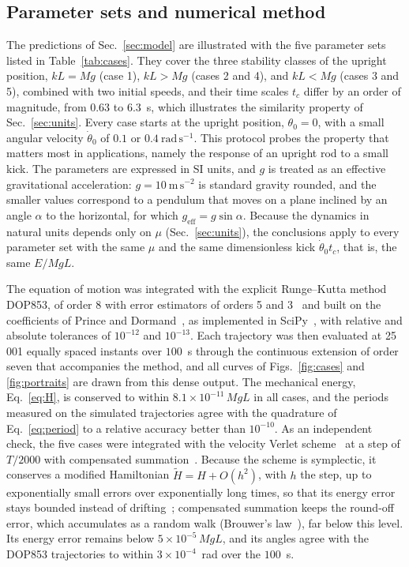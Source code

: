\subsection{Parameter sets and numerical method}\label{sec:cases_method}

The predictions of Sec.~\ref{sec:model} are illustrated with the five parameter sets listed in Table~\ref{tab:cases}. They cover the three stability classes of the upright position, $kL=Mg$ (case 1), $kL>Mg$ (cases 2 and 4), and $kL<Mg$ (cases 3 and 5), combined with two initial speeds, and their time scales $t_c$ differ by an order of magnitude, from $0.63$ to $6.3$~s, which illustrates the similarity property of Sec.~\ref{sec:units}. Every case starts at the upright position, $\theta_0=0$, with a small angular velocity $\dot\theta_0$ of $0.1$ or $0.4\ \mathrm{rad\,s^{-1}}$. This protocol probes the property that matters most in applications, namely the response of an upright rod to a small kick. The parameters are expressed in SI units, and $g$ is treated as an effective gravitational acceleration: $g=10\ \mathrm{m\,s^{-2}}$ is standard gravity rounded, and the smaller values correspond to a pendulum that moves on a plane inclined by an angle $\alpha$ to the horizontal, for which $g_{\mathrm{eff}}=g\sin\alpha$. Because the dynamics in natural units depends only on $\mu$ (Sec.~\ref{sec:units}), the conclusions apply to every parameter set with the same $\mu$ and the same dimensionless kick $\dot\theta_0t_c$, that is, the same $E/MgL$.

The equation of motion was integrated with the explicit Runge--Kutta method DOP853, of order 8 with error estimators of orders 5 and 3~\cite{HairerNW1993} and built on the coefficients of Prince and Dormand~\cite{PrinceDormand1981}, as implemented in SciPy~\cite{Virtanen2020}, with relative and absolute tolerances of $10^{-12}$ and $10^{-13}$. Each trajectory was then evaluated at 25\,001 equally spaced instants over $100$~s through the continuous extension of order seven that accompanies the method, and all curves of Figs.~\ref{fig:cases} and \ref{fig:portraits} are drawn from this dense output. The mechanical energy, Eq.~\eqref{eq:H}, is conserved to within $8.1\times10^{-11}\,MgL$ in all cases, and the periods measured on the simulated trajectories agree with the quadrature of Eq.~\eqref{eq:period} to a relative accuracy better than $10^{-10}$. As an independent check, the five cases were integrated with the velocity Verlet scheme~\cite{Verlet1967,Swope1982} at a step of $T/2000$ with compensated summation~\cite{Kahan1965}. Because the scheme is symplectic, it conserves a modified Hamiltonian $\tilde H=H+O(h^{2})$, with $h$ the step, up to exponentially small errors over exponentially long times, so that its energy error stays bounded instead of drifting~\cite{BenettinGiorgilli1994,HairerLW2006}; compensated summation keeps the round-off error, which accumulates as a random walk (Brouwer's law~\cite{Brouwer1937}), far below this level. Its energy error remains below $5\times10^{-5}\,MgL$, and its angles agree with the DOP853 trajectories to within $3\times10^{-4}$~rad over the $100$~s.

